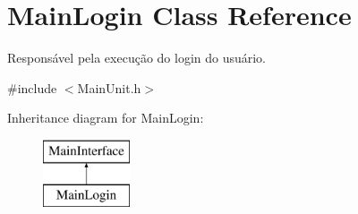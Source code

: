\hypertarget{classMainLogin}{\section{Main\-Login Class Reference}
\label{db/df3/classMainLogin}
}


Responsável pela execução do login do usuário.  




{\ttfamily \#include $<$Main\-Unit.\-h$>$}

Inheritance diagram for Main\-Login\-:\begin{figure}[H]
\begin{center}
\leavevmode
\includegraphics[height=2.000000cm]{db/df3/classMainLogin}
\end{center}
\end{figure}
